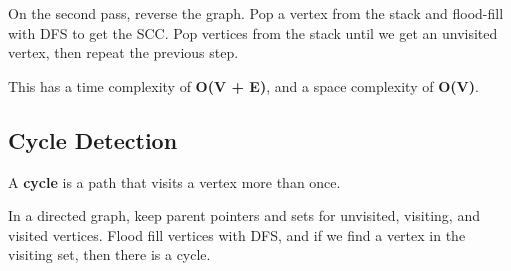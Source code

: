 On the second pass, reverse the graph. Pop a vertex from the stack and flood-fill with DFS to get the SCC.
Pop vertices from the stack until we get an unvisited vertex, then repeat the previous step.

This has a time complexity of \textbf{O(V + E)}, and a space complexity of \textbf{O(V)}.

\subsection{Cycle Detection}
A \textbf{cycle} is a path that visits a vertex more than once.

In a directed graph, keep parent pointers and sets for unvisited, visiting, and visited vertices.
Flood fill vertices with DFS, and if we find a vertex in the visiting set, then there is a cycle.